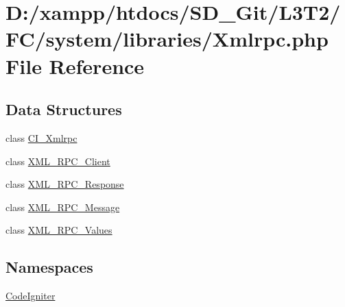 \hypertarget{_xmlrpc_8php}{}\section{D\+:/xampp/htdocs/\+S\+D\+\_\+\+Git/\+L3\+T2/\+F\+C/system/libraries/\+Xmlrpc.php File Reference}
\label{_xmlrpc_8php}
\subsection*{Data Structures}
\begin{DoxyCompactItemize}
\item 
class \hyperlink{class_c_i___xmlrpc}{C\+I\+\_\+\+Xmlrpc}
\item 
class \hyperlink{class_x_m_l___r_p_c___client}{X\+M\+L\+\_\+\+R\+P\+C\+\_\+\+Client}
\item 
class \hyperlink{class_x_m_l___r_p_c___response}{X\+M\+L\+\_\+\+R\+P\+C\+\_\+\+Response}
\item 
class \hyperlink{class_x_m_l___r_p_c___message}{X\+M\+L\+\_\+\+R\+P\+C\+\_\+\+Message}
\item 
class \hyperlink{class_x_m_l___r_p_c___values}{X\+M\+L\+\_\+\+R\+P\+C\+\_\+\+Values}
\end{DoxyCompactItemize}
\subsection*{Namespaces}
\begin{DoxyCompactItemize}
\item 
 \hyperlink{namespace_code_igniter}{Code\+Igniter}
\end{DoxyCompactItemize}
